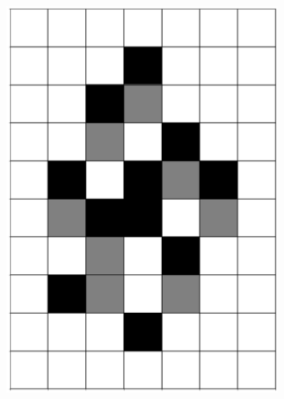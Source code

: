 \documentclass[12pt]{article}
\numberwithin{figure}{section} %
\begin{document}
\begin{figure}[H]
\begin{subfigure}{0.16\textwidth}
     		\includegraphics[width=\linewidth]{Section4/21.4}
     		\subcaption{}
   	\end{subfigure}
	\begin{subfigure}{0.16\textwidth}
     		\centering

\end{subfigure}
\end{figure}
\end{document}
